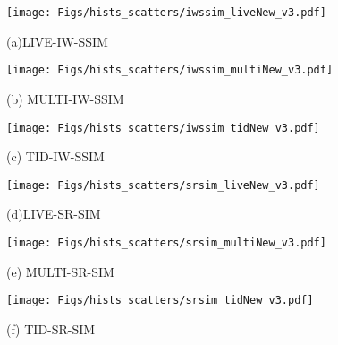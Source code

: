\documentclass[draftcls,12pt, onecolumn]{IEEEtran}
\begin{document}
\vspace{-4.0mm}


\begin{center}

\begin{figure}[htbp!]
\begin{minipage}[b]{0.28\linewidth}
  \centering
\texttt{[image: Figs/hists\_scatters/iwssim\_liveNew\_v3.pdf]}
  \vspace{0.03cm}
  \centerline{\footnotesize{(a)LIVE-IW-SSIM}}\vspace{-0.45cm}
\end{minipage}
 \vspace{0.2cm}
\hfill
\begin{minipage}[b]{0.28\linewidth}
  \centering
\texttt{[image: Figs/hists\_scatters/iwssim\_multiNew\_v3.pdf]}
  \vspace{0.03 cm}
  \centerline{\footnotesize{(b) MULTI-IW-SSIM   } }\vspace{-0.45cm}
\end{minipage}
 \vspace{0.2cm}
\hfill
\begin{minipage}[b]{0.28\linewidth}
  \centering
\texttt{[image: Figs/hists\_scatters/iwssim\_tidNew\_v3.pdf]}
  \vspace{0.03cm}
  \centerline{\footnotesize{(c) TID-IW-SSIM }}\vspace{-0.45cm}
\end{minipage}

\begin{minipage}[b]{0.28\linewidth}
  \centering
\texttt{[image: Figs/hists\_scatters/srsim\_liveNew\_v3.pdf]}
  \vspace{0.03cm}
  \centerline{\footnotesize{(d)LIVE-SR-SIM}}\vspace{-0.45cm}
\end{minipage}
 \vspace{0.2cm}
\hfill
\begin{minipage}[b]{0.28\linewidth}
  \centering
\texttt{[image: Figs/hists\_scatters/srsim\_multiNew\_v3.pdf]}
  \vspace{0.03 cm}
  \centerline{\footnotesize{(e) MULTI-SR-SIM   } }\vspace{-0.45cm}
\end{minipage}
 \vspace{0.2cm}
\hfill
\begin{minipage}[b]{0.28\linewidth}
  \centering
\texttt{[image: Figs/hists\_scatters/srsim\_tidNew\_v3.pdf]}
  \vspace{0.03cm}
  \centerline{\footnotesize{(f) TID-SR-SIM }}\vspace{-0.45cm}
\end{minipage}





\end{figure}
\end{center}
\end{document}
